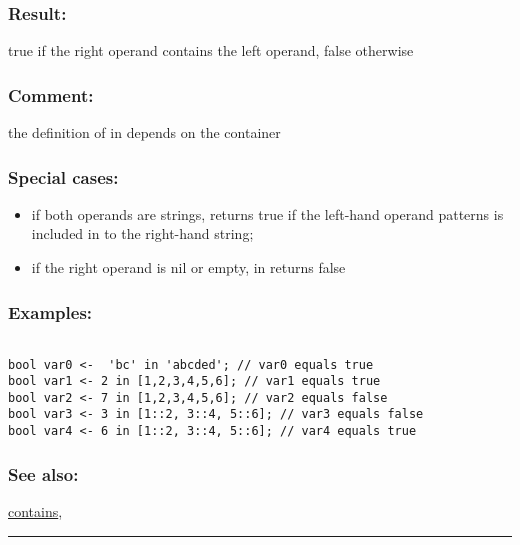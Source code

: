 \documentclass[]{book}
\providecommand{\tightlist}{%
  \setlength{\itemsep}{0pt}\setlength{\parskip}{0pt}}
\theoremstyle{definition}
\theoremstyle{definition}
\theoremstyle{definition}
\theoremstyle{remark}
\begin{document}
\subsubsection{Result:}\label{result-256}

true if the right operand contains the left operand, false otherwise

\subsubsection{Comment:}\label{comment-51}

the definition of in depends on the container

\subsubsection{Special cases:}\label{special-cases-77}

\begin{itemize}
\tightlist
\item
  if both operands are strings, returns true if the left-hand operand
  patterns is included in to the right-hand string;\\
\item
  if the right operand is nil or empty, in returns false
\end{itemize}

\subsubsection{Examples:}\label{examples-204}

\begin{verbatim}
 
bool var0 <-  'bc' in 'abcded'; // var0 equals true 
bool var1 <- 2 in [1,2,3,4,5,6]; // var1 equals true 
bool var2 <- 7 in [1,2,3,4,5,6]; // var2 equals false 
bool var3 <- 3 in [1::2, 3::4, 5::6]; // var3 equals false 
bool var4 <- 6 in [1::2, 3::4, 5::6]; // var4 equals true
\end{verbatim}

\subsubsection{See also:}\label{see-also-114}

\href{OperatorsBC\#contains}{contains},

\begin{center}\rule{0.5\linewidth}{\linethickness}\end{center}
\end{document}
